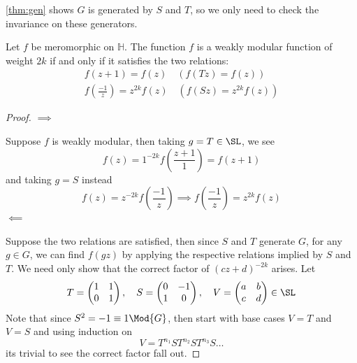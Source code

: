\documentclass[12pt]{article}
\theoremstyle{definition}
\begin{document}
\cref{thm:gen} shows \(G\) is generated by \(S\) and \(T\), so  we only need to check the invariance on these generators.
\begin{prop}
Let \(f\) be meromorphic on \(\mathbb{H}\). The function \(f\) is a weakly modular function of weight \(2k\) if and only if it satisfies the two relations:
\begin{align*}
f(z+1) = f(z) \quad (f(Tz)=f(z))\\
f\left(\frac{-1}{z}\right) = z^{2k}f(z) \quad (f(Sz) = z^{2k}f(z))
\end{align*}
\end{prop}  
\begin{proof}
\(\implies\)

\smallskip 
Suppose \(f\) is weakly modular, then taking \(g = T \in \SL\), we see
\[
    f(z) = 1^{-2k} f\left(\frac{z+1}{1}\right) = f(z+1)
\] 
and taking \(g= S\) instead
\[
    f(z) = z^{-2k} f\left(\frac{-1}{z}\right) \implies f\left(\frac{-1}{z}\right) = z^{2k}f(z)
\] 
\(\impliedby\)

\smallskip
Suppose the two relations are satisfied, then since \(S\) and \(T\) generate \(G\), for any \(g\in G\), we can find \(f(gz)\) by applying the respective relations implied by \(S\) and \(T\). We need only show that the correct factor of \((cz+d)^{-2k}\) arises. 
Let 
\[
    T = \begin{pmatrix}
        1 &  1 \\
        0 &  1 \\
    \end{pmatrix}, \quad S = \begin{pmatrix}
        0 &  -1 \\
        1 &  0 \\
    \end{pmatrix}, \quad V = \begin{pmatrix}
        a & b  \\
        c & d  \\
    \end{pmatrix} \in \SL
\] 
Note that since \(S^2 = -1 \equiv 1 \Mod{G}\), then start with base cases \(V=T\) and \(V=S\) and using induction on  
\[
    V = T^{n_1}S T^{n_2}S T^{n_3}S\dots
\] 
its trivial to see the correct factor fall out.
\end{proof}
\end{document}
